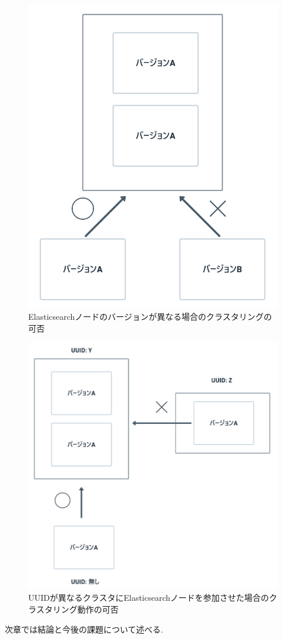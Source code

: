 \begin{figure}[H]
  \begin{center}
    \includegraphics[width=120mm]{sotu/figure/youshi-3.png}
    \caption{Elasticsearchノードのバージョンが異なる場合のクラスタリングの可否}
    \label{4-p16}
  \end{center}
\end{figure}

\begin{figure}[H]
  \begin{center}
    \includegraphics[width=120mm]{sotu/figure/youshi-4.png}
    \caption{UUIDが異なるクラスタにElasticsearchノードを参加させた場合のクラスタリング動作の可否}
    \label{4-p17}
  \end{center}
\end{figure}

次章では結論と今後の課題について述べる.
